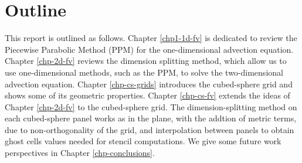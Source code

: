 \section{Outline}
This report is outlined as follows.
Chapter \ref{chp1-1d-fv} is dedicated to review the Piecewise Parabolic Method (PPM)
for the one-dimensional advection equation. 
Chapter \ref{chp-2d-fv} reviews the dimension splitting method, which allow us to use 
one-dimensional methods, such as the PPM, to solve the two-dimensional advection equation.
Chapter \ref{chp-cs-grids} introduces the cubed-sphere grid and shows some of its geometric 
properties.
Chapter \ref{chp-cs-fv} extends the ideas of Chapter \ref{chp-2d-fv} to the cubed-sphere grid.
The dimension-splitting method on each cubed-sphere panel works as in the plane, with the addtion
of metric terms, due to non-orthogonality of the grid, and interpolation between panels
to obtain ghost cells values needed for stencil computations. 
We give some future work perspectives in Chapter \ref{chp-conclusions}.
